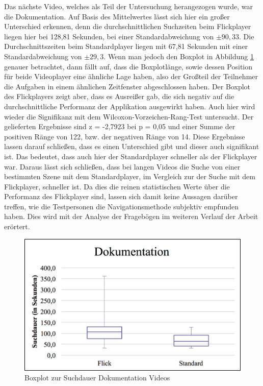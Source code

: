 \documentclass[11pt,a4paper]{report}
\begin{document}
Das nächste Video, welches als Teil der Untersuchung herangezogen wurde, war die Dokumentation. Auf Basis des Mittelwertes lässt sich hier ein großer Unterschied erkennen, denn die durchschnittlichen Suchzeiten beim Flickplayer liegen hier bei 128,81 Sekunden, bei einer Standardabweichung von  $\pm 90,33$. Die Durchschnittszeiten beim Standardplayer liegen mit 67,81 Sekunden mit einer Standardabweichung von $\pm 29,3$. Wenn man jedoch den Boxplot in Abbildung \ref{boxplot_dokumentation} genauer betrachtet, dann fällt auf, dass die Boxplotlänge, sowie dessen Position für beide Videoplayer eine ähnliche Lage haben, also der Großteil der Teilnehmer die Aufgaben in einem ähnlichen Zeitfenster abgeschlossen haben. Der Boxplot des Flickplayers zeigt aber, dass es Ausreißer gab, die sich negativ auf die durchschnittliche Performanz der Applikation ausgewirkt haben. Auch hier wird wieder die Signifikanz mit dem Wilcoxon-Vorzeichen-Rang-Test untersucht. Der gelieferten Ergebnisse sind z = -2,7923 bei p = 0,05 und einer Summe der positiven Ränge von 122, bzw. der negativen Ränge von 14. Diese Ergebnisse lassen darauf schließen, dass es einen Unterschied gibt und dieser auch signifikant ist. Das bedeutet, dass auch hier der Standardplayer schneller als der Flickplayer war. Daraus lässt sich schließen, dass bei langen Videos die Suche von einer bestimmten Szene mit dem Standardplayer, im Vergleich zur der Suche mit dem Flickplayer, schneller ist. Da dies die reinen statistischen Werte über die Performanz des Flickplayer sind, lassen sich damit keine Aussagen darüber treffen, wie die Testpersonen die Navigationsmethode subjektiv empfunden haben. Dies wird mit der Analyse der Fragebögen im weiteren Verlauf der Arbeit erörtert.
\begin{figure}[h]
\begin{center}
\includegraphics[scale=0.9]{./images/34.png}
\caption{Boxplot zur Suchdauer Dokumentation Videos}
\label{boxplot_dokumentation}
\end{center}
\end{figure}
\end{document}
